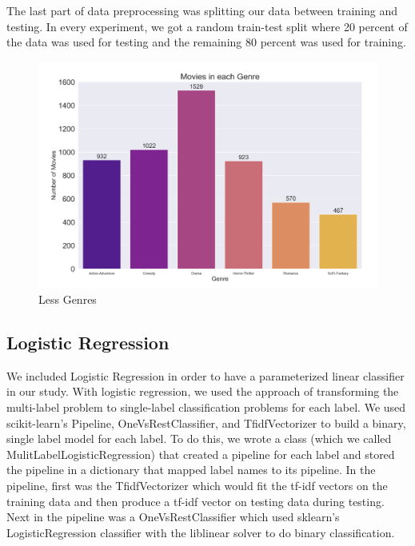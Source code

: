 \documentclass[sigconf]{acmart}
\begin{document}
The last part of data preprocessing was splitting our data between training and testing.  In every experiment, we got a random train-test split where 20 percent of the data was used for testing and the remaining 80 percent was used for training. 

\begin{figure}
	\includegraphics[width=\linewidth]{reduced_genres.png}
	\caption{Less Genres}
	\label{fig:less}
\end{figure}

\subsection{Logistic Regression}
We included Logistic Regression in order to have a parameterized linear classifier in our study. With logistic regression, we used the approach of transforming the multi-label problem to single-label classification problems for each label. We used scikit-learn's Pipeline, OneVsRestClassifier, and TfidfVectorizer to build a binary, single label model for each label.  To do this, we wrote a class (which we called MulitLabelLogisticRegression) that created a pipeline for each label and stored the pipeline in a dictionary that mapped label names to its pipeline. In the pipeline, first was the TfidfVectorizer which would fit the tf-idf vectors on the training data and then produce a tf-idf vector on testing data during testing.  Next in the pipeline was a OneVsRestClassifier which used sklearn's LogisticRegression classifier with the liblinear solver to do binary classification. 
\end{document}
